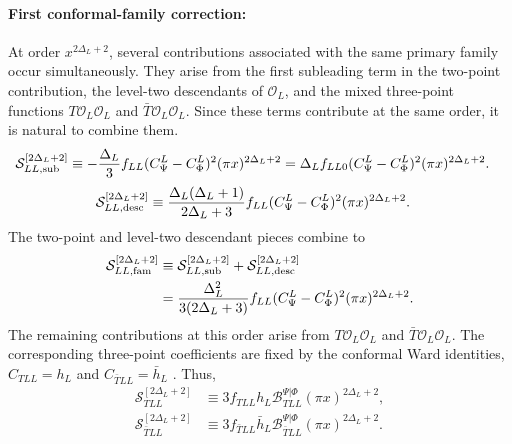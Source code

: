 \documentclass[11pt]{article}
\newcommand{\mO}{\mathcal{O}}
\newcommand{\nn}{\nonumber}
\begin{document}

\paragraph{First conformal-family correction:}
At order $x^{2\Delta_L+2}$, several contributions associated with the
same primary family occur simultaneously. They arise from the first
subleading term in the two-point contribution, the level-two descendants
of $\mathcal O_L$, and the mixed three-point functions
$T\mathcal O_L\mathcal O_L$ and
$\bar T\mathcal O_L\mathcal O_L$. Since these terms contribute at the
same order, it is natural to combine them.
\begin{align}
    \mathcal S_{LL,{\rm sub}}^{[2\Delta_L+2]}
    &\equiv
    -\frac{\Delta_L}{3}
    f_{LL}(C^L_{\Psi}-C^L_{\Phi})^2
    (\pi x)^{2\Delta_L+2} = \Delta_L f_{LL0}(C^L_{\Psi}-C^L_{\Phi})^2
    (\pi x)^{2\Delta_L+2}.
\end{align}
\begin{align}
    \mathcal S_{LL,{\rm desc}}^{[2\Delta_L+2]}
    &\equiv
    \frac{\Delta_L(\Delta_L+1)}
    {2\Delta_L+3}
    f_{LL}(C^L_{\Psi}-C^L_{\Phi})^2
    (\pi x)^{2\Delta_L+2}.
\end{align}
The two-point and level-two descendant pieces combine to
\begin{align}
    \mathcal S_{LL,{\rm fam}}^{[2\Delta_L+2]}
    &\equiv
    \mathcal S_{LL,{\rm sub}}^{[2\Delta_L+2]}
    +
    \mathcal S_{LL,{\rm desc}}^{[2\Delta_L+2]}
    \nn\\
    &=
    \frac{\Delta_L^2}
    {3(2\Delta_L+3)}
    f_{LL}(C^L_{\Psi}-C^L_{\Phi})^2
    (\pi x)^{2\Delta_L+2}.
\end{align}
The remaining contributions at this order arise from
$T\mathcal O_L\mathcal O_L$ and
$\bar T\mathcal O_L\mathcal O_L$. The corresponding three-point
coefficients are fixed by the conformal Ward identities,
$C_{TLL}=h_L$ and $C_{\bar TLL}=\bar h_L$ \cite{yellowbook}. Thus,
\begin{align}
    \mathcal S_{TLL}^{[2\Delta_L+2]}
    &\equiv
    3
    f_{TLL}h_L
    \mathcal B_{TLL}^{\Psi|\Phi}
    (\pi x)^{2\Delta_L+2},
    \\
    \mathcal S_{\bar TLL}^{[2\Delta_L+2]}
    &\equiv
    3
    f_{\bar TLL}\bar h_L
    \mathcal B_{\bar TLL}^{\Psi|\Phi}
    (\pi x)^{2\Delta_L+2}.
\end{align}
\end{document}
